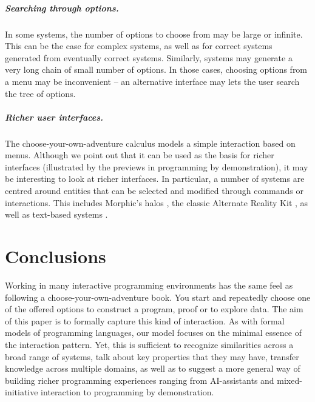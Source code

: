 \documentclass[anonymous, a4paper,UKenglish,cleveref, autoref, thm-restate]{lipics-v2021}
\begin{document}
\subparagraph{Searching through options.}
In some systems, the number of options to choose from may be large or infinite. This can be the
case for complex systems, as well as for correct systems generated from eventually correct systems.
Similarly, systems may generate a very long chain of small number of options. In those cases,
choosing options from a menu may be inconvenient -- an alternative interface may lets the
user search the tree of options.

\subparagraph{Richer user interfaces.}
The choose-your-own-adventure calculus models a simple interaction based on menus. Although
we point out that it can be used as the basis for richer interfaces (illustrated by the
previews in programming by demonstration), it may be interesting to look at richer interfaces.
In particular, a number of systems are centred around entities that can be selected and
modified through commands or interactions. This includes Morphic's halos
\cite{maloney-1995-morphic,maloney-2001-morphic}, the classic Alternate Reality Kit \cite{smith-1986-ark},
as well as text-based systems \cite{camarena-2025-embark}.

\section{Conclusions}
Working in many interactive programming environments has the same feel as following a
choose-your-own-adventure book. You start and repeatedly choose one of the offered options to
construct a program, proof or to explore data. The aim of this paper is to formally capture
this kind of interaction. As with formal models of programming languages, our model focuses on
the minimal essence of the interaction pattern. Yet, this is sufficient to recognize similarities
across a broad range of systems, talk about key properties that they may have, transfer knowledge
across multiple domains, as well as to suggest a more general way of building richer programming
experiences ranging from AI-assistants and mixed-initiative interaction to programming by demonstration.

\newpage


\end{document}
